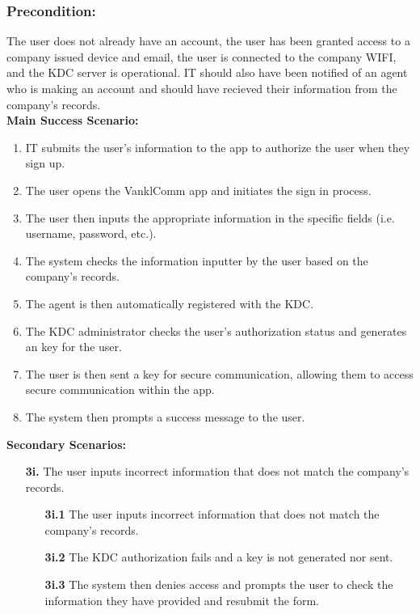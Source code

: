 \documentclass[]{article}
\begin{document}
\subsubsection*{Precondition:} The user does not already have an account, the user has been granted access to a company issued device and email, the user is connected to the company WIFI, and the KDC server is operational. IT should also have been notified of an agent who is making an account and should have recieved their information from the company's records.\\
\textbf{Main Success Scenario:}
\begin{enumerate}
	\item IT submits the user's information to the app to authorize the user when they sign up.
	\item The user opens the VanklComm app and initiates the sign in process.
	\item The user then inputs the appropriate information in the specific fields (i.e. username, password, etc.).
	\item The system checks the information inputter by the user based on the company's records.
	\item The agent is then automatically registered with the KDC.
	\item The KDC administrator checks the user's authorization status and generates an key for the user.
	\item The user is then sent a key for secure communication, allowing them to access secure communication within the app.
	\item The system then prompts a success message to the user.
\end{enumerate}
\textbf{Secondary Scenarios:}

\begin{enumerate}
	\item[\textbf{3i.}] The user inputs incorrect information that does not match the company’s records.
		\begin{enumerate}
			\item[\textbf{3i.1}] The user inputs incorrect information that does not match the company’s records.
			\item[\textbf{3i.2}] The KDC authorization fails and a key is not generated nor sent.
			\item[\textbf{3i.3}] The system then denies access and prompts the user to check the information they have provided and resubmit the form.
		\end{enumerate}
\end{enumerate}
\end{document}
